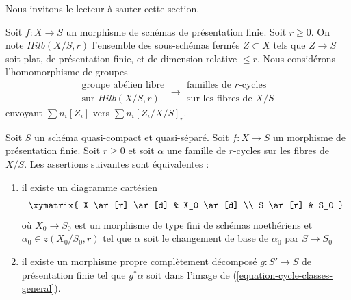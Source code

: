 \noindent
 Nous invitons le lecteur à sauter cette section. 

\medskip\noindent
 Soit  $f : X \to S$  un morphisme de schémas de présentation finie. 
Soit $r \geq 0$. On note  $Hilb(X/S, r)$  l'ensemble des sous-schémas fermés  
$Z \subset X$ tels que  $Z \to S$  soit plat, de présentation finie,
 et de dimension relative $\leq r$. Nous considérons l'homomorphisme de groupes 
\begin{equation} 
\label{equation-cycle-classes-general} 
\begin{matrix} 
\text{groupe abélien libre} \\ 
\text{sur }Hilb(X/S, r) 
\end{matrix} 
\longrightarrow
\begin{matrix} 
\text{familles de }r\text{-cycles}\\ 
\text{sur les fibres de }X/S 
\end{matrix} 
\end{equation} 
envoyant  $\sum n_i[Z_i]$  vers  $\sum n_i[Z_i/X/S]_r$. 

\begin{lemma} 
\label{lemma-relative-r-cycle-general} 
Soit  $S$  un schéma quasi-compact et quasi-séparé. 
Soit  $f : X \to S$  un morphisme de présentation finie. 
Soit  $r \geq 0$  et soit  $\alpha$  une famille de $r$-cycles sur les fibres de $X/S$. 
Les assertions suivantes sont équivalentes : 
\begin{enumerate} 
\item il existe un diagramme cartésien 
$$
\xymatrix{
X \ar[r] \ar[d] & X_0 \ar[d] \\
S \ar[r] & S_0
}
$$
 où  $X_0 \to S_0$  est un morphisme de type fini de schémas noethériens
 et $\alpha_0 \in z(X_0/S_0, r)$  tel que  $\alpha$  soit le changement de base 
de  $\alpha_0$  par $S \to S_0$
\item il existe un morphisme propre complètement décomposé  $g : S' \to S$
  de présentation finie tel que  $g^*\alpha$  soit dans l'image de 
(\ref{equation-cycle-classes-general}). 
\end{enumerate} 
\end{lemma} 

